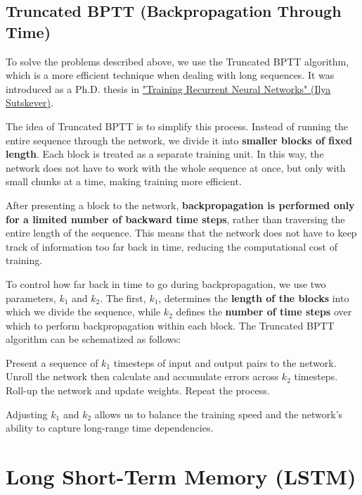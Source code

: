 \subsection{Truncated BPTT (Backpropagation Through Time)}


To solve the problems described above, we use the Truncated BPTT algorithm, which is a more efficient technique when dealing with long sequences. It was introduced as a Ph.D. thesis in \href{https://www.cs.utoronto.ca/~ilya/pubs/ilya_sutskever_phd_thesis.pdf}{"Training Recurrent Neural Networks" (Ilya Sutskever)}.

The idea of Truncated BPTT is to simplify this process. Instead of running the entire sequence through the network, we divide it into \textbf{smaller blocks of fixed length}. Each block is treated as a separate training unit. In this way, the network does not have to work with the whole sequence at once, but only with small chunks at a time, making training more efficient.

After presenting a block to the network, \textbf{backpropagation is performed only for a limited number of backward time steps}, rather than traversing the entire length of the sequence. This means that the network does not have to keep track of information too far back in time, reducing the computational cost of training.

To control how far back in time to go during backpropagation, we use two parameters, $k_1$ and $k_2$. The first, $k_1$, determines the \textbf{length of the blocks} into which we divide the sequence, while $k_2$ defines the \textbf{number of time steps} over which to perform backpropagation within each block. The Truncated BPTT algorithm can be schematized as follows:

\begin{algorithm}
\renewcommand\thealgorithm{}
\caption{}
\begin{algorithmic}[1]
\STATE Present a sequence of $k_1$ timesteps of input and output pairs to the network.
\STATE Unroll the network then calculate and accumulate errors across $k_2$ timesteps.
\STATE Roll-up the network and update weights.
\STATE Repeat the process.
\end{algorithmic}
\end{algorithm}
Adjusting $k_1$ and $k_2$ allows us to balance the training speed and the network's ability to capture long-range time dependencies.

\section{Long Short-Term Memory (LSTM)}

